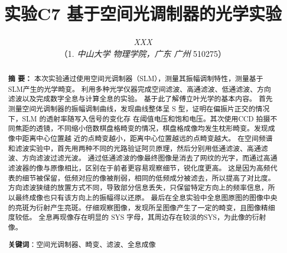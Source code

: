 \documentclass[10pt,a4paper,twoside,UTF8]{ctexart}
\begin{document}
\title{\LARGE\textbf{实验C7 基于空间光调制器的光学实验}\footnotemark[1]}
\author{\large\textit{XXX\footnotemark[2]}
\\ \normalsize{（1. \textit{中山大学 物理学院，广东 广州 }510275）}}
\date{}%


	\maketitle  %
  	\renewcommand{\abstractname} {} %
	\begin{abstract}
	\vspace{-3em}
	{\bf 摘{} 要：}
	{\small 
	本次实验通过使用空间光调制器（SLM），测量其振幅调制特性，测量基于SLM产生的光学畸变。
	利用多种光学仪器完成空间滤波、高通滤波、低通滤波、方向滤波以及完成数字全息与计算全息的实验。
	基于此了解傅立叶光学的基本内容。
	首先测量空间光调制器的振幅调制曲线，发现曲线整体呈 S 型，证明在偏振片正交的情况下，SLM 的透射率随写入信号的变化存
	在阈值电压和饱和电压。其次使用CCD 拍摄不同焦距的透镜，不同缩小倍数棋盘格畸变的情况，棋盘格成像均发生枕形畸变。发现成像中距离中心位置越
	近的点畸变越小，距离中心位置越远的点畸变越大。
	在空间频谱和滤波实验中，首先用两种不同的光路验证阿贝原理，然后分别用低通滤波、高通滤波、方向滤波过滤光波。
	通过低通滤波的像最终图像是消去了网纹的光字，而通过高通滤波器的像与原像相比，区别在于前者更容易观察细节，锐化度更高。
	这是因为高频代表的细节被保留，低频对应的像被削弱，相同的低频成分被滤去，所以提高了对比度。
    方向滤波狭缝的放置方式不同，导致部分信息丢失，只保留特定方向上的频率信息，所以最终成像也只有该方向上的振幅得以还原。
	最后在全息实验中全息图原图的图像中央的亮斑为衍射产生亮斑。仔细观察图像，发现所呈图像产生了一定的畸变，且图像精细度较低。
	全息再现像存在明显的 SYS 字母，其周边存在较淡的SYS，为此像的衍射像。
	}
	\par%
	\textbf{关键词}：空间光调制器、畸变、滤波、全息成像
	\vspace{2em}
	\end{abstract}

\renewcommand{\thefootnote}{\fnsymbol{footnote}}

\end{document}
